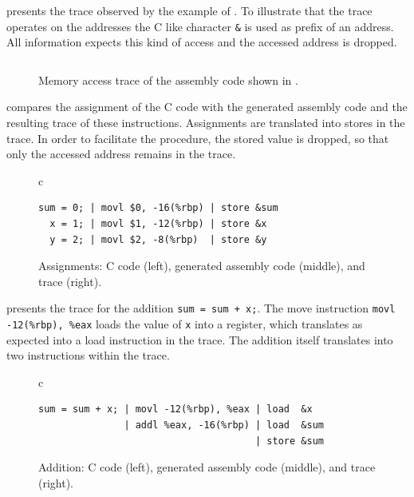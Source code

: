 \documentclass[onecolumn, openright, master, english, signatures]{dbrgrptt}
\begin{document}
 presents the \ac{trace} observed by the example of .
To illustrate that the \ac{trace} operates on the addresses the C like character \texttt{\&} is used as prefix of an address.
All information expects this kind of access and the accessed address is dropped.

\begin{figure}[!ht]
  \centering
  \begin{tabular}{c}
  
  \end{tabular}
  \caption{Memory access trace of the assembly code shown in .}
  \label{fig:mat-example-trace}
\end{figure}

 compares the assignment of the C code with the generated assembly code and the resulting \ac{trace} of these instructions.
Assignments are translated into stores in the \ac{trace}.
In order to facilitate the procedure, the stored value is dropped, so that only the accessed address remains in the \ac{trace}.

\begin{figure}[!ht]
  \centering
  \begin{tabular}{c}
  \begin{lstlisting}
sum = 0; | movl $0, -16(%rbp) | store &sum
  x = 1; | movl $1, -12(%rbp) | store &x
  y = 2; | movl $2, -8(%rbp)  | store &y
  \end{lstlisting}
  \end{tabular}
  \caption{Assignments: C code (left), generated assembly code (middle), and \ac{trace} (right).}
  \label{fig:mat-example-comp-assignment-all}
\end{figure}

 presents the \ac{trace} for the addition \texttt{sum = sum + x;}.
The move instruction \texttt{movl -12(\%rbp), \%eax} loads the value of \texttt{x} into a register, which translates as expected into a load instruction in the \ac{trace}.
The addition itself translates into two instructions within the \ac{trace}.

\begin{figure}[!ht]
  \centering
  \begin{tabular}{c}
  \begin{lstlisting}
sum = sum + x; | movl -12(%rbp), %eax | load  &x
               | addl %eax, -16(%rbp) | load  &sum
                                      | store &sum
  \end{lstlisting}
  \end{tabular}
  \caption{Addition: C code (left), generated assembly code (middle), and \ac{trace} (right).}
  \label{fig:mat-example-comp-addition-all}
\end{figure}
\end{document}
